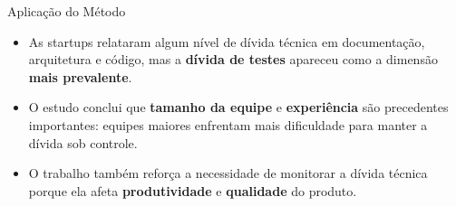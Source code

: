 \begin{frame}{Aplicação do Método}
\begin{itemize}
    \item As startups relataram algum nível de dívida técnica em documentação, arquitetura e código, mas a \textbf{dívida de testes} apareceu como a dimensão \textbf{mais prevalente}. 
    \item O estudo conclui que \textbf{tamanho da equipe} e \textbf{experiência} são precedentes importantes: equipes maiores enfrentam mais dificuldade para manter a dívida sob controle.
    \item O trabalho também reforça a necessidade de monitorar a dívida técnica porque ela afeta \textbf{produtividade} e \textbf{qualidade} do produto.
\end{itemize}
\end{frame}